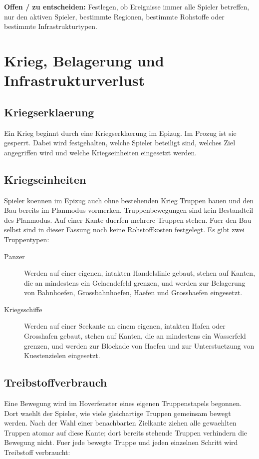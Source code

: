 \documentclass[11pt,a4paper,oneside,parskip=half]{scrreprt}
\newcommand{\offen}[1]{\begin{framed}\noindent\textbf{Offen / zu entscheiden:} #1\end{framed}}
\begin{document}
\offen{Festlegen, ob Ereignisse immer alle Spieler betreffen, nur den aktiven Spieler, bestimmte Regionen, bestimmte Rohstoffe oder bestimmte Infrastrukturtypen.}

\chapter{Krieg, Belagerung und Infrastrukturverlust}

\section{Kriegserklaerung}
Ein Krieg beginnt durch eine Kriegserklaerung im Epizug. Im Prozug ist sie gesperrt. Dabei wird festgehalten, welche Spieler beteiligt sind, welches Ziel angegriffen wird und welche Kriegseinheiten eingesetzt werden.

\section{Kriegseinheiten}
Spieler koennen im Epizug auch ohne bestehenden Krieg Truppen bauen und den Bau
bereits im Planmodus vormerken. Truppenbewegungen sind kein Bestandteil des
Planmodus. Auf einer Kante duerfen mehrere Truppen stehen. Fuer den Bau selbst
sind in dieser Fassung noch keine Rohstoffkosten festgelegt. Es gibt zwei
Truppentypen:
\begin{description}
  \item[Panzer] Werden auf einer eigenen, intakten Handelslinie gebaut, stehen auf Kanten, die an mindestens ein Gelaendefeld grenzen, und werden zur Belagerung von Bahnhoefen, Grossbahnhoefen, Haefen und Grosshaefen eingesetzt.
  \item[Kriegsschiffe] Werden auf einer Seekante an einem eigenen, intakten Hafen oder Grosshafen gebaut, stehen auf Kanten, die an mindestens ein Wasserfeld grenzen, und werden zur Blockade von Haefen und zur Unterstuetzung von Kuestenzielen eingesetzt.
\end{description}

\section{Treibstoffverbrauch}
Eine Bewegung wird im Hoverfenster eines eigenen Truppenstapels begonnen. Dort
waehlt der Spieler, wie viele gleichartige Truppen gemeinsam bewegt werden. Nach
der Wahl einer benachbarten Zielkante ziehen alle gewaehlten Truppen atomar auf
diese Kante; dort bereits stehende Truppen verhindern die Bewegung nicht. Fuer
jede bewegte Truppe und jeden einzelnen Schritt wird Treibstoff verbraucht:
\end{document}
